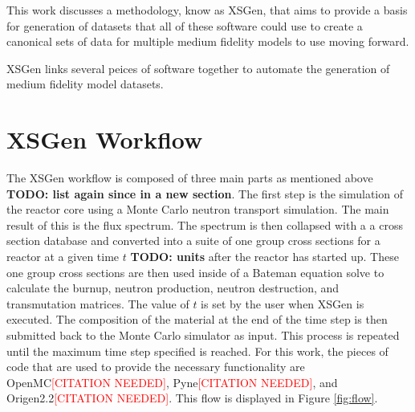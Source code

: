 \documentclass{article}
\newcommand{\citeme}{\textcolor{red}{[CITATION NEEDED]}\xspace}
\newcommand{\TODO}[1] {{\color{red}\textbf{TODO: #1}}}
\begin{document}
This work discusses a methodology, know as XSGen, that aims to provide a basis for generation of datasets that all of these software could use to create a canonical sets of data for multiple medium fidelity models to use moving forward. 

XSGen links several peices of software together to automate the generation of medium fidelity model datasets. 

\section{XSGen Workflow}
The XSGen workflow is composed of three main parts as mentioned above \TODO{list again since in
a new section}. The first step is the simulation of the reactor core using a
Monte Carlo neutron transport simulation. The main result of this is the flux spectrum.
The spectrum is then collapsed with a a cross section database and converted into
a suite of one group cross sections for a reactor at a given time $t$ \TODO{units}
after the reactor has started up. These one group cross sections are then used inside of
a Bateman equation solve to calculate the burnup, neutron production, neutron destruction,
and transmutation matrices. The value of $t$ is set by the user when XSGen is executed.
The composition of the material at the end of the time step is then submitted back to
the Monte Carlo simulator as input. This process is repeated until the maximum time
step specified is reached. For this work, the pieces of code that are used to provide the necessary functionality are OpenMC\citeme, Pyne\citeme, and Origen2.2\citeme. This flow is displayed in Figure \ref{fig:flow}.
\end{document}
